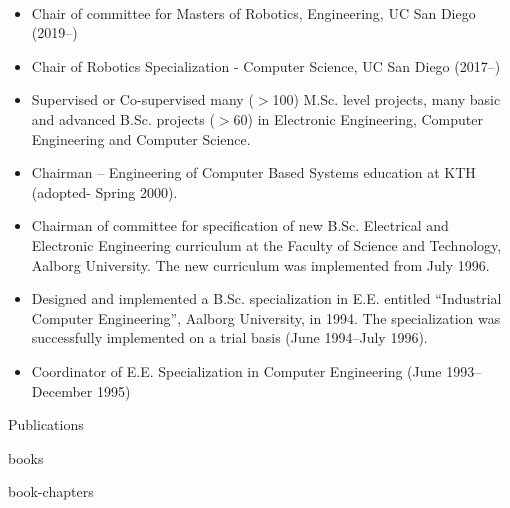 \documentclass{article}
\begin{document}
\begin{cv}
\begin{cvlist}{~}
\item[Other Teaching Activities]
  \begin{itemize}
  \item Chair of committee for Masters of Robotics, Engineering, 
    UC San Diego (2019--)

  \item Chair of Robotics Specialization - Computer Science, UC San
    Diego (2017--)

  \item Supervised or Co-supervised many ($>$100) M.Sc. level projects,
    many basic and advanced B.Sc. projects ($>$60) in Electronic
    Engineering, Computer Engineering and Computer Science.

  \item Chairman -- Engineering of Computer Based Systems education at
    KTH (adopted- Spring 2000).

  \item Chairman of committee for specification of new B.Sc. Electrical
    and Electronic Engineering curriculum at the Faculty of Science and
    Technology, Aalborg University.  The new curriculum was implemented
    from July 1996.

  \item Designed and implemented a B.Sc. specialization in E.E.
    entitled ``Industrial Computer Engineering'', Aalborg University, in
    1994.  The specialization was successfully implemented on a trial
    basis (June 1994--July 1996).

  \item Coordinator of E.E. Specialization in Computer Engineering (June
    1993--December 1995)
\end{itemize}
\end{cvlist}



\begin{cvlist}{Publications}
\item[Books]
  \begin{btSect}{books}
    \btPrintAll
  \end{btSect}

\item[Book Chapters]
  \begin{btSect}{book-chapters}
    \btPrintAll
  \end{btSect}


\end{cvlist}
\end{cv}
\end{document}
